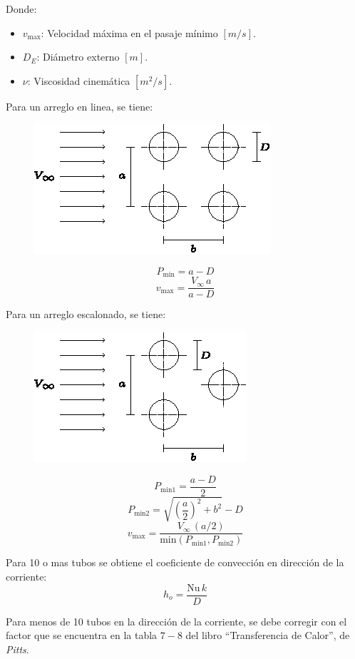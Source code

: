 Donde:
\begin{itemize}
    \item $v_\text{max}$: Velocidad máxima en el pasaje mínimo $[m/s]$.
    \item $D_E$: Diámetro externo $[m]$.
    \item $\nu$: Viscosidad cinemática $[m^2/s]$.
\end{itemize}

Para un arreglo en linea, se tiene:
\begin{figure}[!h]
\centering
\includegraphics[scale=2.00]{figura05_06.eps}
\end{figure}

\begin{equation}
    P_\text{min} = a - D
\end{equation}
\begin{equation}
    v_\text{max} = \frac{V_\infty\,a}{a - D}
\end{equation}

Para un arreglo escalonado, se tiene:
\begin{figure}[!h]
\centering
\includegraphics[scale=2.00]{figura05_07.eps}
\end{figure}

\begin{equation}
    P_\text{min1} = \frac{a - D}{2}
\end{equation}
\begin{equation}
    P_\text{min2} = \sqrt{\left(\frac{a}{2}\right)^2 + b^2} - D
\end{equation}
\begin{equation}
    v_\text{max} = \frac{V_\infty\,(a/2)}{\text{min}(P_\text{min1}, P_\text{min2})}
\end{equation}

Para 10 o mas tubos se obtiene el coeficiente de convección en dirección de la
corriente:
\begin{equation*}
    h_o = \frac{\text{Nu}\,k}{D}
\end{equation*}

Para menos de 10 tubos en la dirección de la corriente, se debe corregir con el
factor que se encuentra en la tabla $7-8$ del libro ``Transferencia de
Calor'', de \emph{Pitts}.

